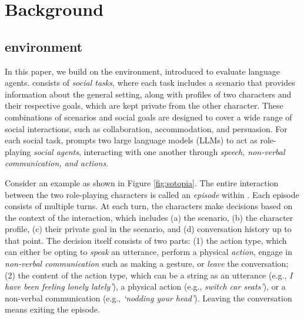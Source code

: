 \section{Background}
\label{sec:background}

\subsection{\sotopia environment}
\label{sec:background:sotopia}
In this paper, we build on the \sotopia \citep{zhou2023sotopia} environment, introduced to evaluate language agents. \sotopia consists of \textit{social tasks}, where each task includes a scenario that provides information about the general setting, along with profiles of two characters and their respective goals, which are kept private from the other character. These combinations of scenarios and social goals are designed to cover a wide range of social interactions, such as collaboration, accommodation, and persuasion. For each social task, \sotopia prompts two large language models (LLMs) to act as role-playing \textit{social agents}, interacting with one another through \textit{speech, non-verbal communication, and actions.}

Consider an example as shown in Figure \ref{fig:sotopia}. The entire interaction between the two role-playing characters is called an \textit{episode} within \sotopia. Each episode consists of multiple turns. At each turn, the characters make decisions based on the context of the interaction, which includes (a) the scenario, (b) the character profile, (c) their private goal in the scenario, and (d) conversation history up to that point. The decision itself consists of two parts: (1) the action type, which can either be opting to \textit{speak} an utterance, perform a physical \textit{action}, engage in \textit{non-verbal communication} such as making a gesture, or \textit{leave} the conversation; (2) the content of the action type, which can be a string as an utterance (e.g., \emph{I have been feeling lonely lately'}), a physical action (e.g., \emph{switch car seats'}), or a non-verbal communication (e.g., \emph{`nodding your head'}). Leaving the conversation means exiting the episode.

